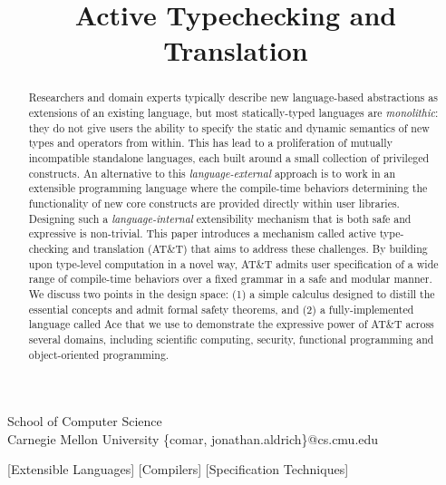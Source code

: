 \documentclass[10pt]{sigplanconf}
\begin{document}
\title{Active Typechecking and Translation}
%
       {School of Computer Science\\
        Carnegie Mellon University}
        {\{comar, jonathan.aldrich\}@cs.cmu.edu}   
%
\maketitle
\begin{abstract}
Researchers and domain experts typically describe new language-based abstractions as extensions of an existing  language, but most statically-typed languages are \emph{monolithic}: they do not give users the ability to specify the static and dynamic semantics of new types and operators from within. This has lead to a proliferation of mutually incompatible standalone languages, each built around a small collection of privileged constructs. 
An alternative to this \emph{language-external} approach is to work in an extensible programming language where the compile-time behaviors determining the functionality of new core constructs are provided directly within user libraries. Designing such a \emph{language-internal} extensibility mechanism that is both safe  and expressive is non-trivial. %
This paper introduces a mechanism called active type-checking and translation (AT\&T) that aims to address these  challenges. By building upon type-level computation in a novel way, AT\&T admits user specification of a wide range of compile-time behaviors over a fixed grammar in a safe and modular manner. We discuss two points in the design space: (1) a simple calculus designed to distill the essential concepts and admit formal safety theorems, and (2) a fully-implemented language called Ace that we use to demonstrate the expressive power of AT\&T across several domains, including scientific computing, security, functional programming and object-oriented programming.
\end{abstract}

[Extensible Languages]
[Compilers]
[Specification Techniques]
\end{document}
